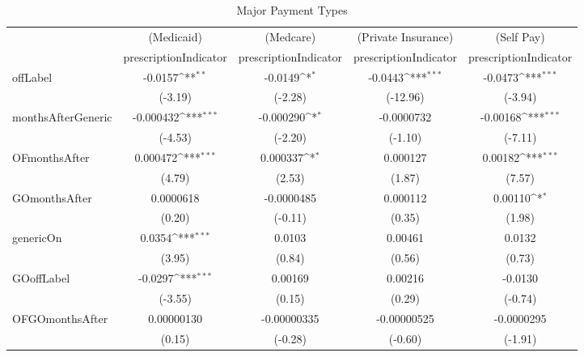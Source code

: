 \begin{table}[htbp]\centering
\def\sym#1{\ifmmode^{#1}\else\(^{#1}\)\fi}
\caption{Major Payment Types\label{tab1}}
\begin{tabular}{l*{4}{c}}
\hline\hline
            &\multicolumn{1}{c}{(Medicaid)}&\multicolumn{1}{c}{(Medcare)}&\multicolumn{1}{c}{(Private Insurance)}&\multicolumn{1}{c}{(Self Pay)}\\
            &\multicolumn{1}{c}{prescriptionIndicator}&\multicolumn{1}{c}{prescriptionIndicator}&\multicolumn{1}{c}{prescriptionIndicator}&\multicolumn{1}{c}{prescriptionIndicator}\\
\hline
offLabel    &     -0.0157\sym{**} &     -0.0149\sym{*}  &     -0.0443\sym{***}&     -0.0473\sym{***}\\
            &     (-3.19)         &     (-2.28)         &    (-12.96)         &     (-3.94)         \\
[1em]
monthsAfterGeneric&   -0.000432\sym{***}&   -0.000290\sym{*}  &  -0.0000732         &    -0.00168\sym{***}\\
            &     (-4.53)         &     (-2.20)         &     (-1.10)         &     (-7.11)         \\
[1em]
OFmonthsAfter&    0.000472\sym{***}&    0.000337\sym{*}  &    0.000127         &     0.00182\sym{***}\\
            &      (4.79)         &      (2.53)         &      (1.87)         &      (7.57)         \\
[1em]
GOmonthsAfter&   0.0000618         &  -0.0000485         &    0.000112         &     0.00110\sym{*}  \\
            &      (0.20)         &     (-0.11)         &      (0.35)         &      (1.98)         \\
[1em]
genericOn   &      0.0354\sym{***}&      0.0103         &     0.00461         &      0.0132         \\
            &      (3.95)         &      (0.84)         &      (0.56)         &      (0.73)         \\
[1em]
GOoffLabel  &     -0.0297\sym{***}&     0.00169         &     0.00216         &     -0.0130         \\
            &     (-3.55)         &      (0.15)         &      (0.29)         &     (-0.74)         \\
[1em]
OFGOmonthsAfter&  0.00000130         & -0.00000335         & -0.00000525         &  -0.0000295         \\
            &      (0.15)         &     (-0.28)         &     (-0.60)         &     (-1.91)         \\

\end{tabular}
\end{table}
